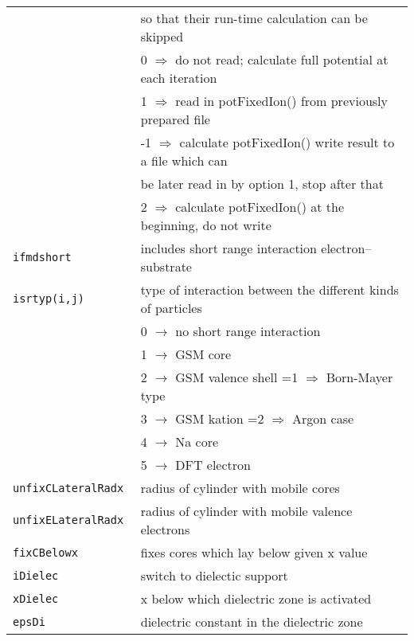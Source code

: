 \documentclass[12pt]{article}
\begin{document}
\begin{enumerate}
\begin{tabular}{ll}
   &  so that their run-time calculation can be skipped\\
   &   0 $\Longrightarrow$ do not read; calculate full potential at each iteration\\
   &   1 $\Longrightarrow$ read in potFixedIon() from previously prepared file\\
   &  -1 $\Longrightarrow$ calculate potFixedIon() write result to a file which can\\
   &\qquad  be later read in by option 1, stop after that\\
   &   2 $\Longrightarrow$ calculate potFixedIon() at the beginning, do not write\\
{\tt ifmdshort} & includes short range interaction electron--substrate\\
{\tt isrtyp(i,j)      }& type of interaction between the different kinds of particles\\
{\tt                  }& 0   $\rightarrow$ no short range interaction\\
{\tt                  }& 1   $\rightarrow$ GSM core\\
{\tt                  }& 2   $\rightarrow$ GSM valence shell    =1 $\Longrightarrow$ Born-Mayer type\\
{\tt                  }& 3   $\rightarrow$ GSM kation                   =2 $\Longrightarrow$ Argon case\\
{\tt                  }& 4   $\rightarrow$ Na core\\
{\tt                  }& 5   $\rightarrow$ DFT electron\\
{\tt unfixCLateralRadx  }& radius of cylinder with mobile cores \\
{\tt unfixELateralRadx  }& radius of cylinder with mobile valence electrons\\
{\tt fixCBelowx       }&   fixes cores which lay below given x value\\
{\tt iDielec          }& switch to dielectic support\\
{\tt xDielec          }& x below which dielectric zone is activated\\
{\tt epsDi            }& dielectric constant in the dielectric zone\\
\hline
\end{tabular}




\end{enumerate}
\end{document}
